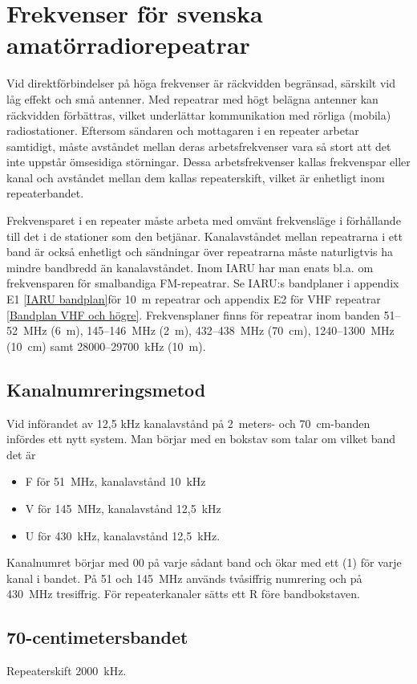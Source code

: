 \chapter{Frekvenser för svenska amatörradiorepeatrar}
\label{svenska repeatrar}

Vid direktförbindelser på höga frekvenser är räckvidden begränsad,
särskilt vid låg effekt och små antenner.
Med repeatrar med högt belägna antenner kan räckvidden förbättras,
vilket underlättar kommunikation med rörliga (mobila) radiostationer.
Eftersom sändaren och mottagaren i en repeater arbetar samtidigt, måste
avståndet mellan deras arbetsfrekvenser vara så stort att det inte uppstår
ömsesidiga störningar.
Dessa arbetsfrekvenser kallas frekvenspar eller kanal och avståndet mellan dem
kallas repeaterskift, vilket är enhetligt inom repeaterbandet.

Frekvensparet i en repeater måste arbeta med omvänt frekvensläge i förhållande
till det i de stationer som den betjänar.
Kanalavståndet mellan repeatrarna i ett band är också enhetligt och sändningar
över repeatrarna måste naturligtvis ha mindre bandbredd än kanalavståndet.
Inom IARU har man enats bl.a. om frekvensparen för smalbandiga FM-repeatrar.
Se IARU:s bandplaner i appendix E1 \ref{IARU bandplan}för 10~m repeatrar och
appendix E2 för VHF repeatrar \ref{Bandplan VHF och högre}.
Frekvensplaner finns för repeatrar inom banden 51--52~MHz (6~m), 145--146~MHz
(2~m), 432--438~MHz (70~cm), 1240--1300~MHz (10~cm) samt 28000--29700~kHz (10~m).

\section{Kanalnumreringsmetod}
Vid införandet av 12,5 kHz kanalavstånd på 2~meters- och 70~cm-banden infördes
ett nytt system.
Man börjar med en bokstav som talar om vilket band det är
\begin{itemize}
  \item F för 51~MHz, kanalavstånd 10~kHz
  \item V för 145~MHz, kanalavstånd 12,5~kHz
  \item U för 430~kHz, kanalavstånd 12,5~kHz.
\end{itemize}
Kanalnumret börjar med 00 på varje sådant band och ökar med ett (1) för varje
kanal i bandet.
På 51 och 145~MHz används tvåsiffrig numrering och på 430~MHz tresiffrig.
För repeaterkanaler sätts ett R före bandbokstaven.

\section{70-centimetersbandet}
Repeaterskift 2000~kHz.

